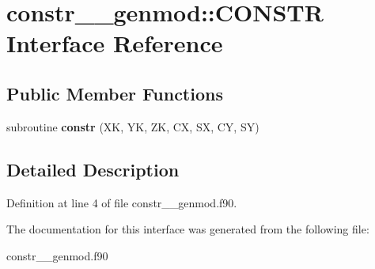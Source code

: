 \hypertarget{interfaceconstr____genmod_1_1_c_o_n_s_t_r}{\section{constr\+\_\+\+\_\+genmod\+:\+:C\+O\+N\+S\+T\+R Interface Reference}
\label{interfaceconstr____genmod_1_1_c_o_n_s_t_r}
}
\subsection*{Public Member Functions}
\begin{DoxyCompactItemize}
\item 
\hypertarget{interfaceconstr____genmod_1_1_c_o_n_s_t_r_af7e4311d453da8ccb40bbeea63e7c41b}{subroutine {\bfseries constr} (X\+K, Y\+K, Z\+K, C\+X, S\+X, C\+Y, S\+Y)}\label{interfaceconstr____genmod_1_1_c_o_n_s_t_r_af7e4311d453da8ccb40bbeea63e7c41b}

\end{DoxyCompactItemize}


\subsection{Detailed Description}


Definition at line 4 of file constr\+\_\+\+\_\+genmod.\+f90.



The documentation for this interface was generated from the following file\+:\begin{DoxyCompactItemize}
\item 
constr\+\_\+\+\_\+genmod.\+f90\end{DoxyCompactItemize}
